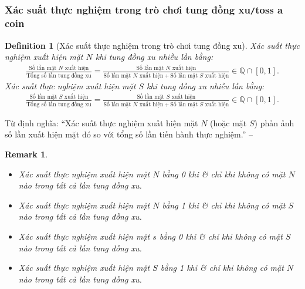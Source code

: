 \documentclass{article}
\numberwithin{equation}{section}
\newtheorem{definition}{Definition}[section]
\newtheorem{remark}{Remark}[section]
\begin{document}
\subsubsection{Xác suất thực nghiệm trong trò chơi tung đồng xu\texttt{/}toss a coin}
\begin{definition}[Xác suất thực nghiệm trong trò chơi tung đồng xu]
	\emph{Xác suất thực nghiệm xuất hiện mặt $N$} khi tung đồng xu nhiều lần bằng:
	\begin{align*}
		\frac{\mbox{Số lần mặt $N$ xuất hiện}}{\mbox{Tổng số lần tung đồng xu}} = \frac{\mbox{Số lần mặt $N$ xuất hiện}}{\mbox{Số lần mặt $N$ xuất hiện} + \mbox{Số lần mặt $S$ xuất hiện}}\in\mathbb{Q}\cap[0,1].
	\end{align*}
	\emph{Xác suất thực nghiệm xuất hiện mặt $S$} khi tung đồng xu nhiều lần bằng:
	\begin{align*}
		\frac{\mbox{Số lần mặt $S$ xuất hiện}}{\mbox{Tổng số lần tung đồng xu}} = \frac{\mbox{Số lần mặt $S$ xuất hiện}}{\mbox{Số lần mặt $N$ xuất hiện} + \mbox{Số lần mặt $S$ xuất hiện}}\in\mathbb{Q}\cap[0,1].
	\end{align*}
\end{definition}
Từ định nghĩa: ``Xác suất thực nghiệm xuất hiện mặt $N$ (hoặc mặt $S$) phản ảnh số lần xuất hiện mặt đó so với tổng số lần tiến hành thực nghiệm.'' -- \cite[p. 18]{Thai_Anh_Dat_Ha_Loan_Nam_Quang_Toan_6_tap_2}

\begin{remark}
	\begin{itemize}
		\item Xác suất thực nghiệm xuất hiện mặt $N$ bằng 0 khi \textit{\&} chỉ khi không có mặt $N$ nào trong tất cả lần tung đồng xu.
		\item Xác suất thực nghiệm xuất hiện mặt $N$ bằng 1 khi \textit{\&} chỉ khi không có mặt $S$ nào trong tất cả lần tung đồng xu.
		\item Xác suất thực nghiệm xuất hiện mặt $s$ bằng 0 khi \textit{\&} chỉ khi không có mặt $S$ nào trong tất cả lần tung đồng xu.
		\item Xác suất thực nghiệm xuất hiện mặt $S$ bằng 1 khi \textit{\&} chỉ khi không có mặt $N$ nào trong tất cả lần tung đồng xu.
	\end{itemize}
\end{remark}
\end{document}
